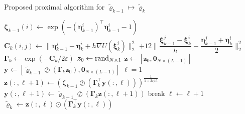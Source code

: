 \documentclass[10pt,twocolumn]{IEEEtran}
\begin{document}
\begin{algorithm}[t]
\caption{Proposed proximal algorithm for $\tilde{\bm{\varrho}}_{k-1}\mapsto\tilde{\bm{\varrho}}_{k}$}
\label{algo:KineticProx}
\begin{algorithmic}[1]
\State $\bm{\zeta}_{k-1}(i) \gets \exp\left(-\left(\bm{\eta}_{k-1}^{i}\right)^{\top}\bm{\eta}_{k-1}^{i}-1\right)$
\State $\bm{C}_{k}(i,j) \gets \parallel\bm{\eta}_{k-1}^{j} - \bm{\eta}_{k}^{i}+ h\nabla U(\bm{\xi}_{k}^{i})\parallel_{2}^{2}$
\State \qquad\quad $+12\bigg\|\dfrac{\bm{\xi}_{k-1}^{j}-\bm{\xi}_{k}^{i}}{h} - \dfrac{\bm{\eta}_{k-1}^{j} + \bm{\eta}_{k}^{i}}{2}\bigg\|_{2}^{2}$
\EndFor
\EndFor
\State $\bm{\Gamma}_{k} \gets \exp\left(-\bm{C}_{k}/2\varepsilon\right)$ 
\State $\bm{z}_{0} \gets {\rm{rand}}_{N\times 1}$ 
\State $\bm{z} \gets \left[\bm{z}_{0}, \bm{0}_{N\times(L-1)}\right]$ 
\State $\bm{y} \gets \left[\tilde{\bm{\varrho}}_{k-1}\oslash\left(\bm{\Gamma}_{k}\bm{z}_{0}\right), \bm{0}_{N\times(L-1)}\right]$ 
\State $\ell = 1$
\State $\bm{z}(:,\ell+1) \gets \left(\bm{\zeta}_{k-1}\oslash\left(\bm{\Gamma}_{k}^{\top}\bm{y}(:,\ell)\right)\right)^{\frac{1}{1+2\varepsilon/h}}$
\State $\bm{y}(:,\ell+1) \gets \tilde{\bm{\varrho}}_{k-1} \oslash \left(\bm{\Gamma}_{k}\bm{z}(:,\ell+1)\right)$
 
\State break
\Else
\State $\ell \gets \ell + 1$
\EndIf
\EndWhile\\
\Return $\tilde{\bm{\varrho}}_{k} \gets \bm{z}(:,\ell) \odot \left(\bm{\Gamma}_{k}^{\top}\bm{y}(:,\ell)\right)$ 
\EndProcedure	
\end{algorithmic}
\end{algorithm}
\end{document}
